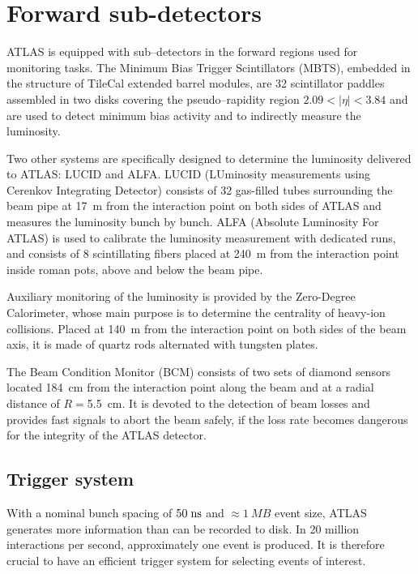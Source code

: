 \section{Forward sub-detectors}
\label{sec:forward}

ATLAS is equipped with sub--detectors in the forward regions used for
monitoring tasks.
The Minimum Bias Trigger Scintillators (MBTS), embedded in the
structure of TileCal extended barrel modules, are 32 scintillator
paddles assembled in two disks covering the pseudo--rapidity region
$2.09<|\eta|<3.84$ and are used to detect minimum bias activity and to
indirectly measure the luminosity.

Two other systems are specifically designed to determine the
luminosity delivered to ATLAS: LUCID and ALFA.
LUCID (LUminosity measurements using Cerenkov Integrating Detector)
consists of 32 gas-filled tubes surrounding the beam pipe at 17~m from
the interaction point on both sides of ATLAS and measures the
luminosity bunch by bunch. 
ALFA (Absolute Luminosity For ATLAS) is used to calibrate the
luminosity measurement with dedicated runs, and consists of 8
scintillating fibers placed at 240~m from the interaction point inside
roman pots, above and below the beam pipe.

Auxiliary monitoring of the luminosity is provided by the Zero-Degree
Calorimeter, whose main purpose is to determine the centrality of heavy-ion
collisions.
Placed at 140~m from the interaction point on both sides of the beam axis,
it is made of quartz rods alternated with tungsten plates.

The Beam Condition Monitor (BCM) consists of two sets of
diamond sensors located 184~cm from the interaction point along the
beam and at a radial distance of $R=$5.5~cm. 
It is devoted to the detection of beam losses and provides fast
signals to abort the beam safely, if the loss rate becomes dangerous
for the integrity of the ATLAS detector.

\subsection{Trigger system}
\label{sec:triggerDAQ}

With a nominal bunch spacing of \mbox{$50 \; \mathrm{ns}$} and
\mbox{$\approx{}1~MB$} event size, ATLAS generates more
information than can be recorded to disk. In 20 million 
interactions per second, approximately one \ttbar{} event 
is produced. It is therefore crucial to have an efficient trigger
system for selecting events of interest.

